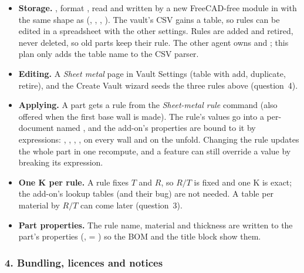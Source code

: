 \begin{itemize}[nosep]
  \item \textbf{Storage.} , format , read and
        written by a new FreeCAD-free module  in  with the
        same shape as  (, , , ). The
        vault's CSV gains a  table, so rules can be edited in a spreadsheet with the other settings.
        Rules are added and retired, never deleted, so old parts keep their rule. The other agent owns
         and ; this plan only adds the table name to the CSV parser.
  \item \textbf{Editing.} A \emph{Sheet metal} page in Vault Settings (table with add, duplicate, retire), and the
        Create Vault wizard seeds the three rules above (question~4).
  \item \textbf{Applying.} A part gets a rule from the \emph{Sheet-metal rule} command (also offered when the first base
        wall is made). The rule's values go into a per-document  named , and the
        add-on's properties are bound to it by expressions: , , ,
        ,  on every wall and  on the unfold. Changing the rule updates the
        whole part in one recompute, and a feature can still override a value by breaking its expression.
  \item \textbf{One K per rule.} A rule fixes $T$ and $R$, so $R/T$ is fixed and one K is exact; the add-on's
        lookup tables (and their bug) are not needed. A table per material by $R/T$ can come later (question~3).
  \item \textbf{Part properties.} The rule name, material and thickness are written to the part's properties
        (,  = ) so the BOM and the title block show them.
\end{itemize}

\subsubsection*{4. Bundling, licences and notices}

